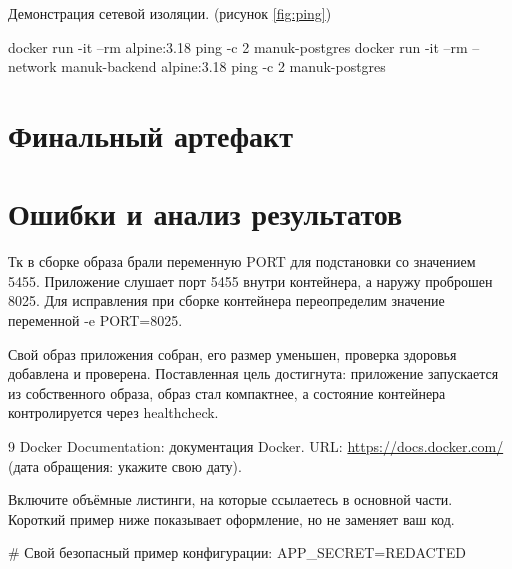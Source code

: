 
Демонстрация сетевой изоляции. (рисунок \ref{fig:ping})
\begin{code}
docker run -it --rm alpine:3.18 ping -c 2 manuk-postgres
docker run -it --rm --network manuk-backend alpine:3.18 ping -c 2 manuk-postgres
\end{code}


\section{Финальный артефакт}


\section{Ошибки и анализ результатов}

Тк в сборке образа брали переменную PORT для подстановки со значением 5455. Приложение слушает порт 5455 внутри контейнера, а наружу проброшен 8025. Для исправления при сборке контейнера переопределим значение переменной -e PORT=8025.



Свой образ приложения собран, его размер уменьшен, проверка здоровья добавлена и проверена. Поставленная цель достигнута: приложение запускается из собственного образа, образ стал компактнее, а состояние контейнера контролируется через healthcheck.

\begin{thebibliography}{9}
  Docker Documentation: документация Docker.
  URL: \url{https://docs.docker.com/}
  (дата обращения: укажите свою дату).
\end{thebibliography}

\startreportappendices
{}

Включите объёмные листинги, на которые ссылаетесь в основной части.
Короткий пример ниже показывает оформление, но не заменяет ваш код.

\begin{code}
# Свой безопасный пример конфигурации:
APP_SECRET=REDACTED
\end{code}
